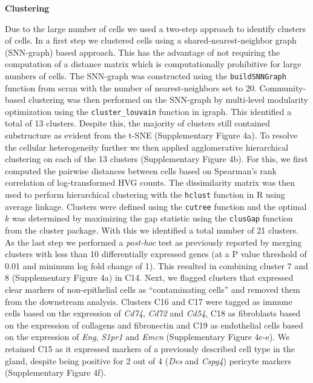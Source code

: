 \documentclass[titlepage, 12pt, oneside]{amsart}
\begin{document}
\textbf{Clustering}

Due to the large number of cells we used a two-step approach to identify clusters of cells.
In a first step we clustered cells using a shared-nearest-neighbor graph (SNN-graph) based approach.
This has the advantage of not requiring the computation of a distance matrix which is computationally prohibitive for large numbers of cells.
The SNN-graph was constructed using the \texttt{buildSNNGraph} function from scran with the number of nearest-neighbors set to 20\autocite{Lun2016a}.
Community-based clustering was then performed on the SNN-graph by multi-level modularity optimization using the \texttt{cluster\_louvain} function in igraph\autocite{Csardi2006}.
This identified a total of 13 clusters.
Despite this, the majority of clusters still contained substructure as evident from the t-SNE (Supplementary Figure 4a).
To resolve the cellular heterogeneity further we then applied agglomerative hierarchical clustering on each of the 13 clusters (Supplementary Figure 4b).
For this, we first computed the pairwise distances between cells based on Spearman's rank correlation of log-transformed HVG counts.
The dissimilarity matrix was then used to perform hierarchical clustering with the \texttt{hclust} function in R using average linkage.
Clusters were defined using the \texttt{cutree} function and the optimal $k$ was determined by maximizing the gap statistic using the \texttt{clusGap} function from the cluster package\autocite{Maechler2017}.
With this we identified a total number of 21 clusters.
As the last step we performed a \textit{post-hoc} test as previously reported\autocite{Macosko2015} by merging clusters with less than 10 differentially expressed genes (at a P value threshold of 0.01 and minimum log fold change of 1).
This resulted in combining cluster 7 and 8 (Supplementary Figure 4a) in C14.
Next, we flagged clusters that expressed clear markers of non-epithelial cells as ``contaminating cells'' and removed them from the downstream analysis.
Clusters C16 and C17 were tagged as immune cells based on the expression of \textit{Cd74}, \textit{Cd72} and \textit{Cd54}\autocite{Scheele2017}, C18 as fibroblasts based on the expression of collagens and fibronectin and C19 as endothelial cells based on the expression of \textit{Eng}, \textit{S1pr1} and \textit{Emcn} (Supplementary Figure 4c-e).
We retained C15 as it expressed markers of a previously described cell type in the gland\autocite{Wang2015}, despite being positive for 2 out of 4 (\textit{Des} and \textit{Cspg4}) pericyte markers\autocite{Armulik2011} (Supplementary Figure 4f).
\end{document}
